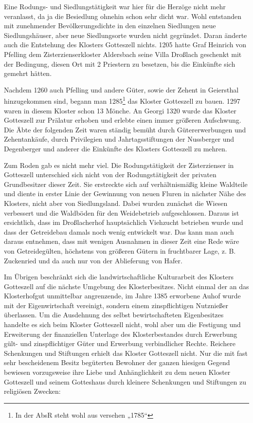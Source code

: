 \documentclass[12pt,a4pager,draft]{book}
\begin{document}
Eine Rodungs- und Siedlungstätigkeit war hier für die Herzöge nicht mehr
veranlasst, da ja die Besiedlung ohnehin schon sehr dicht war. Wohl entstanden
mit zunehmender Bevölkerungsdichte in den einzelnen Siedlungen neue
Siedlungshäuser, aber neue Siedlungsorte wurden nicht gegründet. Daran änderte
auch die Entstehung des Klosters Gotteszell nichts. 1205 hatte Graf Heinrich von
Pfelling dem Zisterzienserkloster Aldersbach seine Villa Droßlach geschenkt mit
der Bedingung, diesen Ort mit 2 Priestern zu besetzen, bis die Einkünfte sich
gemehrt hätten.

Nachdem 1260 auch Pfelling und andere Güter, sowie der Zehent in Geiersthal
hinzugekommen sind, begann man 1285\footnote{In der AbsR steht wohl aus versehen
„1785“} das Kloster Gotteszell zu bauen. 1297 waren in diesem Kloster schon 13
Mönche. An Georgi 1320 wurde das Kloster Gotteszell zur Prälatur erhoben und
erlebte einen immer größeren Aufschwung. Die Äbte der folgenden Zeit waren
ständig bemüht durch Gütererwerbungen und Zehentankäufe, durch Privilegien und
Jahrtagsstiftungen der Nussberger und Degenberger und anderer die Einkünfte des
Klosters Gotteszell zu mehren.

Zum Roden gab es nicht mehr viel. Die Rodungstätigkeit der Zisterzienser in
Gotteszell unterschied sich nicht von der Rodungstätigkeit der privaten
Grundbesitzer dieser Zeit. Sie erstreckte sich auf verhältnismäßig kleine
Waldteile und diente in erster Linie der Gewinnung von neuen Fluren in nächster
Nähe des Klosters, nicht aber von Siedlungsland. Dabei wurden zunächst die
Wiesen verbessert und die Waldböden für den Weidebetrieb aufgeschlossen. Daraus
ist ersichtlich, dass im Droßlacherhof hauptsächlich Viehzucht betrieben wurde
und dass der Getreidebau damals noch wenig entwickelt war. Das kann man auch
daraus entnehmen, dass mit wenigen Ausnahmen in dieser Zeit eine Rede wäre von
Getreidegülten, höchstens von größeren Gütern in fruchtbarer Lage, z. B.
Zuckenried und da auch nur von der Ablieferung von Hafer.

Im Übrigen beschränkt sich die landwirtschaftliche Kulturarbeit des Klosters
Gotteszell auf die nächste Umgebung des Klosterbesitzes. Nicht einmal der an das
Klosterhofgut unmittelbar angrenzende, im Jahre 1385 erworbene Auhof wurde mit
der Eigenwirtschaft vereinigt, sondern einem zinspflichtigen Nutznießer
überlassen. Um die Ausdehnung des selbst bewirtschafteten Eigenbesitzes handelte
es sich beim Kloster Gotteszell nicht, wohl aber um die Festigung und
Erweiterung der finanziellen Unterlage des Klosterbestandes durch Erwerbung
gült- und zinspflichtiger Güter und Erwerbung verbindlicher Rechte. Reichere
Schenkungen und Stiftungen erhielt das Kloster Gotteszell nicht. Nur die mit
fast sehr bescheidenem Besitz begüterten Bewohner der ganzen hiesigen Gegend
bewiesen vorzugsweise ihre Liebe und Anhänglichkeit zu dem neuen Kloster
Gotteszell und seinem Gotteshaus durch kleinere Schenkungen und Stiftungen zu
religiösen Zwecken:
\end{document}
